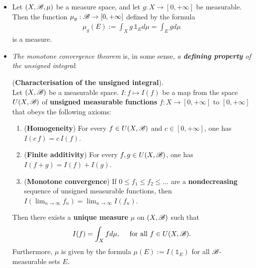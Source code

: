 \documentclass[11pt]{article}
\begin{document}
\begin{itemize}
\item \begin{proposition} 
Let $(X, {\mathscr B}, \mu)$ be a measure space, and let $g: X \rightarrow [0, +\infty]$ be measurable. Then the function $\mu_g : {\mathscr B} \rightarrow [0, +\infty]$ defined by the formula
\begin{align*}
\mu_g(E) := \int_X g\,\mathds{1}_{E} d\mu = \int_E g d\mu
\end{align*} is a measure.
\end{proposition}

\item \emph{The monotone convergence theorem} is, in some sense, \emph{a \textbf{defining property} of the unsigned integral}:
\begin{proposition} (\textbf{Characterisation of the unsigned integral}). \\
Let $(X, {\mathscr B})$ be a measurable space. $I: f \mapsto I(f)$ be a map from the space $U(X, {\mathscr B})$ of \textbf{unsigned measurable functions} $f: X \rightarrow [0, +\infty]$ to $[0, +\infty]$ that obeys the following axioms:
\begin{enumerate}
\item (\textbf{Homogeneity}) For every $f \in U(X, {\mathscr B})$ and $c \in [0, +\infty]$, one has $I(c\,f) = c\,I(f)$.
\item (\textbf{Finite additivity}) For every $f, g  \in U(X, {\mathscr B})$, one has $I(f + g) = I(f) + I(g)$.
\item (\textbf{Monotone convergence}) If $0 \le f_1 \le f_2 \le \ldots$ are a \textbf{nondecreasing} sequence of unsigned measurable functions, then $I(\lim_{n\rightarrow \infty} f_n) = \lim_{n\rightarrow \infty} I(f_n)$.
\end{enumerate}
Then there exists a \textbf{unique measure} $\mu$ on $(X, {\mathscr B})$ such that 
\begin{align*}
I(f) = \int_X f d\mu, \quad \text{ for all }f \in U(X, {\mathscr B}).
\end{align*}
Furthermore, $\mu$ is given by the formula $\mu(E) := I(\mathds{1}_E)$ for all ${\mathscr B}$-measurable sets $E$.
\end{proposition}
\end{itemize}


\newpage


\end{document}

